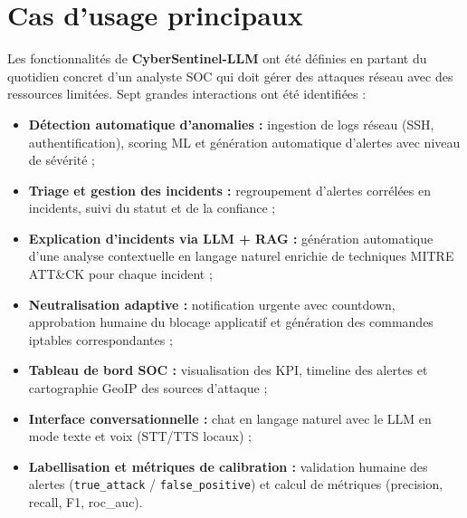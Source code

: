 \documentclass[12pt,a4paper]{report}
\begin{document}
\section{Cas d'usage principaux}
\begin{onehalfspace}
Les fonctionnalités de \textbf{CyberSentinel-LLM} ont été définies en partant
du quotidien concret d'un analyste SOC qui doit gérer des attaques réseau
avec des ressources limitées. Sept grandes interactions ont été identifiées :

\begin{itemize}
  \item[\ding{43}] \textbf{Détection automatique d'anomalies :} ingestion
  de logs réseau (SSH, authentification), scoring ML et génération automatique
  d'alertes avec niveau de sévérité ;
  \item[\ding{43}] \textbf{Triage et gestion des incidents :} regroupement
  d'alertes corrélées en incidents, suivi du statut et de la confiance ;
  \item[\ding{43}] \textbf{Explication d'incidents via LLM + RAG :} génération
  automatique d'une analyse contextuelle en langage naturel enrichie de
  techniques MITRE ATT\&CK pour chaque incident ;
  \item[\ding{43}] \textbf{Neutralisation adaptive :} notification urgente
  avec countdown, approbation humaine du blocage applicatif et génération
  des commandes iptables correspondantes ;
  \item[\ding{43}] \textbf{Tableau de bord SOC :} visualisation des KPI,
  timeline des alertes et cartographie GeoIP des sources d'attaque ;
  \item[\ding{43}] \textbf{Interface conversationnelle :} chat en langage
  naturel avec le LLM en mode texte et voix (STT/TTS locaux) ;
  \item[\ding{43}] \textbf{Labellisation et métriques de calibration :}
  validation humaine des alertes (\texttt{true\_attack} /
  \texttt{false\_positive}) et calcul de métriques (precision, recall,
  F1, roc\_auc).
\end{itemize}
\end{onehalfspace}
\end{document}
